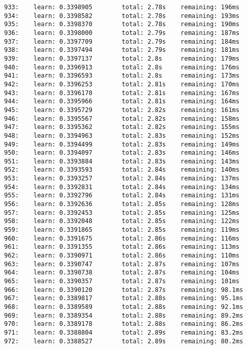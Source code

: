 \documentclass[11pt]{article}
\begin{document}
\begin{Verbatim}[commandchars=\\\{\}]
933:    learn: 0.3398905        total: 2.78s    remaining: 196ms
934:    learn: 0.3398582        total: 2.78s    remaining: 193ms
935:    learn: 0.3398370        total: 2.78s    remaining: 190ms
936:    learn: 0.3398000        total: 2.79s    remaining: 187ms
937:    learn: 0.3397709        total: 2.79s    remaining: 184ms
938:    learn: 0.3397494        total: 2.79s    remaining: 181ms
939:    learn: 0.3397137        total: 2.8s     remaining: 179ms
940:    learn: 0.3396913        total: 2.8s     remaining: 176ms
941:    learn: 0.3396593        total: 2.8s     remaining: 173ms
942:    learn: 0.3396253        total: 2.81s    remaining: 170ms
943:    learn: 0.3396170        total: 2.81s    remaining: 167ms
944:    learn: 0.3395966        total: 2.81s    remaining: 164ms
945:    learn: 0.3395729        total: 2.82s    remaining: 161ms
946:    learn: 0.3395567        total: 2.82s    remaining: 158ms
947:    learn: 0.3395362        total: 2.82s    remaining: 155ms
948:    learn: 0.3394963        total: 2.83s    remaining: 152ms
949:    learn: 0.3394499        total: 2.83s    remaining: 149ms
950:    learn: 0.3394097        total: 2.83s    remaining: 146ms
951:    learn: 0.3393884        total: 2.83s    remaining: 143ms
952:    learn: 0.3393593        total: 2.84s    remaining: 140ms
953:    learn: 0.3393257        total: 2.84s    remaining: 137ms
954:    learn: 0.3392831        total: 2.84s    remaining: 134ms
955:    learn: 0.3392796        total: 2.84s    remaining: 131ms
956:    learn: 0.3392636        total: 2.85s    remaining: 128ms
957:    learn: 0.3392453        total: 2.85s    remaining: 125ms
958:    learn: 0.3392048        total: 2.85s    remaining: 122ms
959:    learn: 0.3391865        total: 2.85s    remaining: 119ms
960:    learn: 0.3391675        total: 2.86s    remaining: 116ms
961:    learn: 0.3391355        total: 2.86s    remaining: 113ms
962:    learn: 0.3390971        total: 2.86s    remaining: 110ms
963:    learn: 0.3390747        total: 2.87s    remaining: 107ms
964:    learn: 0.3390738        total: 2.87s    remaining: 104ms
965:    learn: 0.3390357        total: 2.87s    remaining: 101ms
966:    learn: 0.3390120        total: 2.87s    remaining: 98.1ms
967:    learn: 0.3389817        total: 2.88s    remaining: 95.1ms
968:    learn: 0.3389589        total: 2.88s    remaining: 92.1ms
969:    learn: 0.3389354        total: 2.88s    remaining: 89.2ms
970:    learn: 0.3389178        total: 2.88s    remaining: 86.2ms
971:    learn: 0.3388804        total: 2.89s    remaining: 83.2ms
972:    learn: 0.3388527        total: 2.89s    remaining: 80.2ms

\end{Verbatim}
\end{document}
